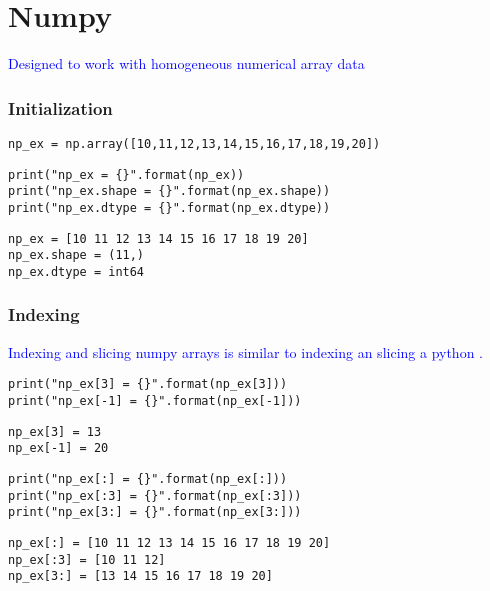 \section{Numpy}

\textcolor{blue}{Designed to work with homogeneous numerical array data}


\subsubsection{Initialization}

\begin{lstlisting}[style=pyInStyle]
np_ex = np.array([10,11,12,13,14,15,16,17,18,19,20])
\end{lstlisting}

\begin{lstlisting}[style=pyInStyle]
print("np_ex = {}".format(np_ex))
print("np_ex.shape = {}".format(np_ex.shape))
print("np_ex.dtype = {}".format(np_ex.dtype))
\end{lstlisting}
\begin{lstlisting}[style=pyOutStyle]
np_ex = [10 11 12 13 14 15 16 17 18 19 20]
np_ex.shape = (11,)
np_ex.dtype = int64
\end{lstlisting}

\subsubsection{Indexing}

\textcolor{blue}{Indexing and slicing numpy arrays is similar to indexing an slicing a python .}

\begin{lstlisting}[style=pyInStyle]
print("np_ex[3] = {}".format(np_ex[3]))
print("np_ex[-1] = {}".format(np_ex[-1]))
\end{lstlisting}
\begin{lstlisting}[style=pyOutStyle]
np_ex[3] = 13
np_ex[-1] = 20
\end{lstlisting}

\begin{lstlisting}[style=pyInStyle]
print("np_ex[:] = {}".format(np_ex[:]))
print("np_ex[:3] = {}".format(np_ex[:3]))
print("np_ex[3:] = {}".format(np_ex[3:]))
\end{lstlisting}
\begin{lstlisting}[style=pyOutStyle]
np_ex[:] = [10 11 12 13 14 15 16 17 18 19 20]
np_ex[:3] = [10 11 12]
np_ex[3:] = [13 14 15 16 17 18 19 20]
\end{lstlisting}

